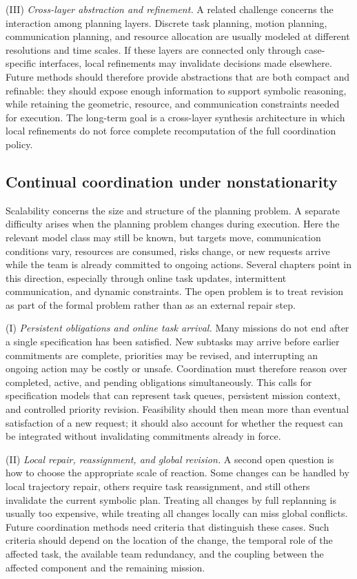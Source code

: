 (III) \emph{Cross-layer abstraction and refinement.}
A related challenge concerns the interaction among planning layers. Discrete
task planning, motion planning, communication planning, and resource
allocation are usually modeled at different resolutions and time scales. If
these layers are connected only through case-specific interfaces, local refinements
may invalidate decisions made elsewhere. Future methods should therefore provide
abstractions that are both compact and refinable: they should expose enough
information to support symbolic reasoning, while retaining the geometric,
resource, and communication constraints needed for execution. The long-term
goal is a cross-layer synthesis architecture in which local refinements do not
force complete recomputation of the full coordination policy.

\subsection{Continual coordination under nonstationarity}
\label{sec:ch07_continual}

Scalability concerns the size and structure of the planning problem. A
separate difficulty arises when the planning problem changes during execution.
Here the relevant model class may still be known, but targets move,
communication conditions vary, resources are consumed, risks change, or new
requests arrive while the team is already committed to ongoing actions.
Several chapters point in this direction, especially through online task
updates, intermittent communication, and dynamic constraints. The open problem
is to treat revision as part of the formal problem rather than as an external
repair step.

(I) \emph{Persistent obligations and online task arrival.}
Many missions do not end after a single specification has been satisfied. New
subtasks may arrive before earlier commitments are complete, priorities may be
revised, and interrupting an ongoing action may be costly or unsafe.
Coordination must therefore reason over completed, active, and pending
obligations simultaneously. This calls for specification models that can
represent task queues, persistent mission context, and controlled priority
revision. Feasibility should then mean more than eventual satisfaction of a
new request; it should also account for whether the request can be integrated
without invalidating commitments already in force.

(II) \emph{Local repair, reassignment, and global revision.}
A second open question is how to choose the appropriate scale of reaction.
Some changes can be handled by local trajectory repair, others require task
reassignment, and still others invalidate the current symbolic plan. Treating
all changes by full replanning is usually too expensive, while treating all
changes locally can miss global conflicts. Future coordination methods need
criteria that distinguish these cases. Such criteria should depend on the
location of the change, the temporal role of the affected task, the available
team redundancy, and the coupling between the affected component and the remaining
mission.

